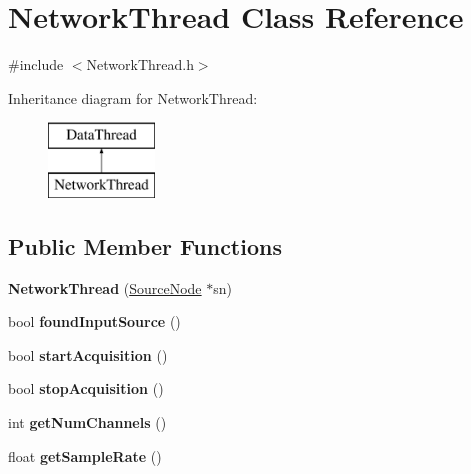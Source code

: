 \hypertarget{classNetworkThread}{\section{Network\-Thread Class Reference}
\label{classNetworkThread}
}


{\ttfamily \#include $<$Network\-Thread.\-h$>$}

Inheritance diagram for Network\-Thread\-:\begin{figure}[H]
\begin{center}
\leavevmode
\includegraphics[height=2.000000cm]{classNetworkThread}
\end{center}
\end{figure}
\subsection*{Public Member Functions}
\begin{DoxyCompactItemize}
\item 
\hypertarget{classNetworkThread_adaea87d580354e65bab33405e6e05fe6}{{\bfseries Network\-Thread} (\hyperlink{classSourceNode}{Source\-Node} $\ast$sn)}\label{classNetworkThread_adaea87d580354e65bab33405e6e05fe6}

\item 
\hypertarget{classNetworkThread_a8ded78dab341e5c7c98ccf5fa34f6bb5}{bool {\bfseries found\-Input\-Source} ()}\label{classNetworkThread_a8ded78dab341e5c7c98ccf5fa34f6bb5}

\item 
\hypertarget{classNetworkThread_ae30402dfc01f183929896c07b2efeec5}{bool {\bfseries start\-Acquisition} ()}\label{classNetworkThread_ae30402dfc01f183929896c07b2efeec5}

\item 
\hypertarget{classNetworkThread_a2cc1f3d1e83ab57c2a55657fb6d63956}{bool {\bfseries stop\-Acquisition} ()}\label{classNetworkThread_a2cc1f3d1e83ab57c2a55657fb6d63956}

\item 
\hypertarget{classNetworkThread_a37d244c39c0b0c52882a439638942d40}{int {\bfseries get\-Num\-Channels} ()}\label{classNetworkThread_a37d244c39c0b0c52882a439638942d40}

\item 
\hypertarget{classNetworkThread_a7212f2e4b930e2831e79143bd90b07ab}{float {\bfseries get\-Sample\-Rate} ()}\label{classNetworkThread_a7212f2e4b930e2831e79143bd90b07ab}

\end{DoxyCompactItemize}
